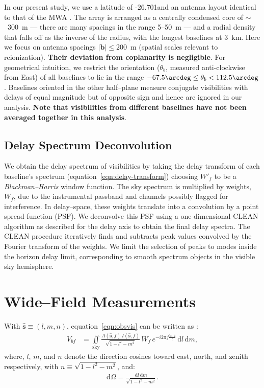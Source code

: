 \documentclass[preprint2,iop,numberedappendix]{emulateapj}
\newcommand{\dif}{\mathrm{d}}
\begin{document}
In our present study, we use a latitude of -26.701\arcdeg and an antenna layout identical to that of the MWA \citep{bea12}. The array is arranged as a centrally condensed core of $\sim$~300~m --- there are many spacings in the range 5--50~m --- and a radial density that falls off as the inverse of the radius, with the longest baselines at 3~km. Here we focus on antenna spacings $|\boldsymbol{b}| \le 200$~m (spatial scales relevant to reionization). {\bf Their deviation from coplanarity is negligible}. For geometrical intuition, we restrict the orientation ($\theta_b$, measured anti-clockwise from East) of all baselines to lie in the range $-67.5\arcdeg \leq \theta_b < 112.5\arcdeg$. Baselines oriented in the other half--plane measure conjugate visibilities with delays of equal magnitude but of opposite sign and hence are ignored in our analysis. {\bf Note that visibilities from different baselines have not been averaged together in this analysis}. 

\subsection{Delay Spectrum Deconvolution}\label{sec:data-delay-spectrum}

We obtain the delay spectrum of visibilities by taking the delay transform of each baseline's spectrum (equation~\ref{eqn:delay-transform}) choosing $W'_f$ to be a {\it Blackman--Harris} window function. The sky spectrum is multiplied by weights, $W_f$, due to the instrumental passband and channels possibly flagged for interference. In delay--space, these weights translate into a convolution by a point spread function (PSF). We deconvolve this PSF using a one dimensional CLEAN algorithm \citep{tay99} as described for the delay axis \citep{par09,par12b} to obtain the final delay spectra. The CLEAN procedure iteratively finds and subtracts peak values convolved by the Fourier transform of the weights. We limit the selection of peaks to modes inside the horizon delay limit, corresponding to smooth spectrum objects in the visible sky hemisphere. 

\section{Wide--Field Measurements}\label{sec:wide-field}

With $\hat{\boldsymbol{s}}\equiv (l,m,n)$, equation~\ref{eqn:obsvis} can be written as \citep{tay99,tho01}:
\begin{align}\label{eqn:obsvis-lmn}
  V_{bf} &= \iint\limits_\textrm{sky} \frac{A(\hat{\boldsymbol{s}},f)\,I(\hat{\boldsymbol{s}},f)}{\sqrt{1-l^2-m^2}}\,W_f\,e^{-i2\pi f\frac{\boldsymbol{b}\cdot\hat{\boldsymbol{s}}}{c}}\,\dif l\,\dif m, 
\end{align}
where, $l$, $m$, and $n$ denote the direction cosines toward east, north, and zenith respectively, with $n\equiv\sqrt{1-l^2-m^2}$, and:
\begin{align}\label{eqn:solid-angle}
  \dif\Omega = \frac{\dif l\,\dif m}{\sqrt{1-l^2-m^2}}.
\end{align}
\end{document}
